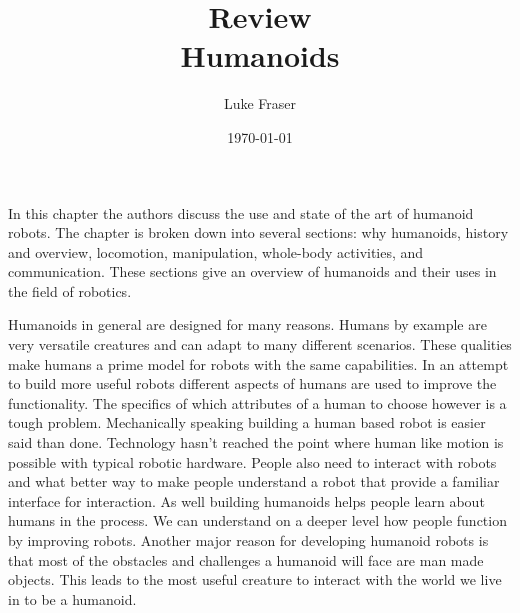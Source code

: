 \documentclass{article}
\begin{document}
\title{{\large Review} \\ Humanoids}
\author{Luke Fraser}
\date{\today}
\maketitle

\begingroup
\renewcommand{\section}[2]{}


\endgroup

\section*{Summary}
In this chapter the authors discuss the use and state of the art of humanoid robots. The chapter is broken down into several sections: why humanoids, history and overview, locomotion, manipulation, whole-body activities, and communication. These sections give an overview of humanoids and their uses in the field of robotics.

Humanoids in general are designed for many reasons. Humans by example are very versatile creatures and can adapt to many different scenarios. These qualities make humans a prime model for robots with the same capabilities. In an attempt to build more useful robots different aspects of humans are used to improve the functionality. The specifics of which attributes of a human to choose however is a tough problem. Mechanically speaking building a human based robot is easier said than done. Technology hasn't reached the point where human like motion is possible with typical robotic hardware. People also need to interact with robots and what better way to make people understand a robot that provide a familiar interface for interaction.  As well building humanoids helps people learn about humans in the process. We can understand on a deeper level how people function by improving robots. Another major reason for developing humanoid robots is that most of the obstacles and challenges a humanoid will face are man made objects. This leads to the most useful creature to interact with the world we live in to be a humanoid.
\end{document}
